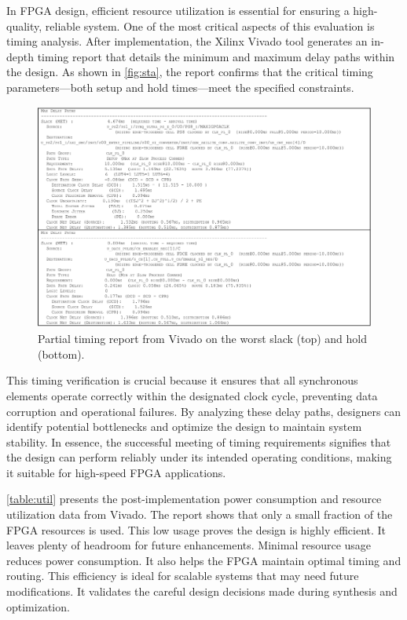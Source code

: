 In FPGA design, efficient resource utilization is essential for ensuring a high-quality, reliable system. One of the most critical aspects of this evaluation is timing analysis. After implementation, the Xilinx Vivado tool generates an in-depth timing report that details the minimum and maximum delay paths within the design. As shown in \autoref{fig:sta}, the report confirms that the critical timing parameters—both setup and hold times—meet the specified constraints.
\begin{figure}[h]
    \centering
    \includegraphics[width=1\linewidth]{figures/timimg_report.png}
    \caption{Partial timing report from Vivado on the worst slack (top) and hold (bottom).}
    \label{fig:sta}
\end{figure}
This timing verification is crucial because it ensures that all synchronous elements operate correctly within the designated clock cycle, preventing data corruption and operational failures. By analyzing these delay paths, designers can identify potential bottlenecks and optimize the design to maintain system stability. In essence, the successful meeting of timing requirements signifies that the design can perform reliably under its intended operating conditions, making it suitable for high-speed FPGA applications.

\autoref{table:util} presents the post-implementation power consumption and resource utilization data from Vivado. The report shows that only a small fraction of the FPGA resources is used. This low usage proves the design is highly efficient. It leaves plenty of headroom for future enhancements. Minimal resource usage reduces power consumption. It also helps the FPGA maintain optimal timing and routing. This efficiency is ideal for scalable systems that may need future modifications. It validates the careful design decisions made during synthesis and optimization.

